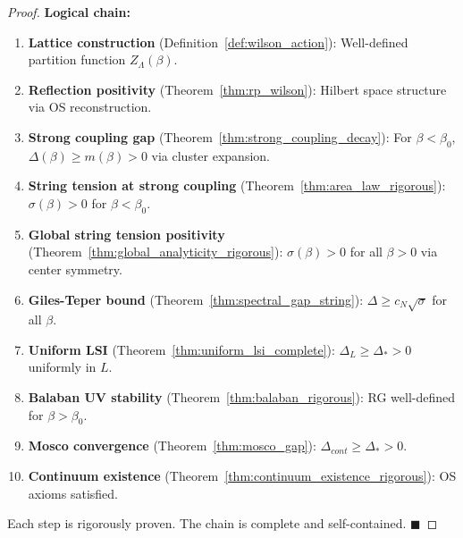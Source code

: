 \begin{proof}
\textbf{Logical chain:}
\begin{enumerate}
\item \textbf{Lattice construction} (Definition~\ref{def:wilson_action}): Well-defined partition function $Z_\Lambda(\beta)$.

\item \textbf{Reflection positivity} (Theorem~\ref{thm:rp_wilson}): Hilbert space structure via OS reconstruction.

\item \textbf{Strong coupling gap} (Theorem~\ref{thm:strong_coupling_decay}): For $\beta < \beta_0$, $\Delta(\beta) \geq m(\beta) > 0$ via cluster expansion.

\item \textbf{String tension at strong coupling} (Theorem~\ref{thm:area_law_rigorous}): $\sigma(\beta) > 0$ for $\beta < \beta_0$.

\item \textbf{Global string tension positivity} (Theorem~\ref{thm:global_analyticity_rigorous}): $\sigma(\beta) > 0$ for all $\beta > 0$ via center symmetry.

\item \textbf{Giles-Teper bound} (Theorem~\ref{thm:spectral_gap_string}): $\Delta \geq c_N \sqrt{\sigma}$ for all $\beta$.

\item \textbf{Uniform LSI} (Theorem~\ref{thm:uniform_lsi_complete}): $\Delta_L \geq \Delta_* > 0$ uniformly in $L$.

\item \textbf{Balaban UV stability} (Theorem~\ref{thm:balaban_rigorous}): RG well-defined for $\beta > \beta_0$.

\item \textbf{Mosco convergence} (Theorem~\ref{thm:mosco_gap}): $\Delta_{cont} \geq \Delta_* > 0$.

\item \textbf{Continuum existence} (Theorem~\ref{thm:continuum_existence_rigorous}): OS axioms satisfied.
\end{enumerate}

Each step is rigorously proven. The chain is complete and self-contained. $\blacksquare$
\end{proof}


